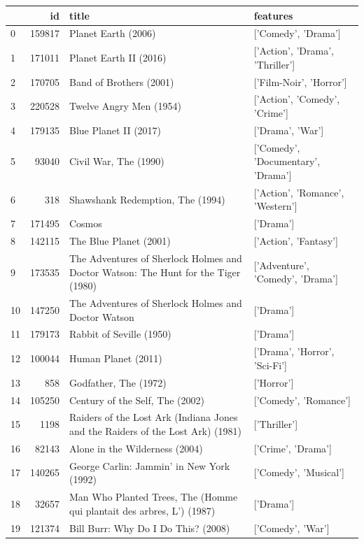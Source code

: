 
\begin{tabular}{lrll}
\toprule
 & id & title & features \\
\midrule
0 & 159817 & Planet Earth (2006) & ['Comedy', 'Drama'] \\
1 & 171011 & Planet Earth II (2016) & ['Action', 'Drama', 'Thriller'] \\
2 & 170705 & Band of Brothers (2001) & ['Film-Noir', 'Horror'] \\
3 & 220528 & Twelve Angry Men (1954) & ['Action', 'Comedy', 'Crime'] \\
4 & 179135 & Blue Planet II (2017) & ['Drama', 'War'] \\
5 & 93040 & Civil War, The (1990) & ['Comedy', 'Documentary', 'Drama'] \\
6 & 318 & Shawshank Redemption, The (1994) & ['Action', 'Romance', 'Western'] \\
7 & 171495 & Cosmos & ['Drama'] \\
8 & 142115 & The Blue Planet (2001) & ['Action', 'Fantasy'] \\
9 & 173535 & The Adventures of Sherlock Holmes and Doctor Watson: The Hunt for the Tiger (1980) & ['Adventure', 'Comedy', 'Drama'] \\
10 & 147250 & The Adventures of Sherlock Holmes and Doctor Watson & ['Drama'] \\
11 & 179173 & Rabbit of Seville (1950) & ['Drama'] \\
12 & 100044 & Human Planet (2011) & ['Drama', 'Horror', 'Sci-Fi'] \\
13 & 858 & Godfather, The (1972) & ['Horror'] \\
14 & 105250 & Century of the Self, The (2002) & ['Comedy', 'Romance'] \\
15 & 1198 & Raiders of the Lost Ark (Indiana Jones and the Raiders of the Lost Ark) (1981) & ['Thriller'] \\
16 & 82143 & Alone in the Wilderness (2004) & ['Crime', 'Drama'] \\
17 & 140265 & George Carlin: Jammin' in New York (1992) & ['Comedy', 'Musical'] \\
18 & 32657 & Man Who Planted Trees, The (Homme qui plantait des arbres, L') (1987) & ['Drama'] \\
19 & 121374 & Bill Burr: Why Do I Do This? (2008) & ['Comedy', 'War'] \\
\bottomrule
\end{tabular}
